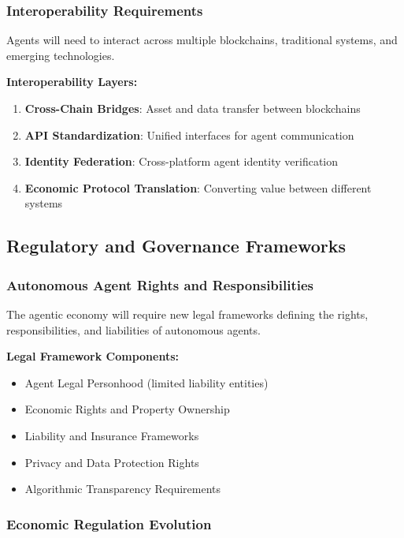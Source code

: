 \documentclass[12pt,a4paper]{article}
\begin{document}
\subsubsection{Interoperability Requirements}

Agents will need to interact across multiple blockchains, traditional systems, and emerging technologies.

\textbf{Interoperability Layers:}
\begin{enumerate}
\item \textbf{Cross-Chain Bridges}: Asset and data transfer between blockchains
\item \textbf{API Standardization}: Unified interfaces for agent communication
\item \textbf{Identity Federation}: Cross-platform agent identity verification
\item \textbf{Economic Protocol Translation}: Converting value between different systems
\end{enumerate}

\subsection{Regulatory and Governance Frameworks}

\subsubsection{Autonomous Agent Rights and Responsibilities}

The agentic economy will require new legal frameworks defining the rights, responsibilities, and liabilities of autonomous agents.

\textbf{Legal Framework Components:}
\begin{itemize}
\item Agent Legal Personhood (limited liability entities)
\item Economic Rights and Property Ownership
\item Liability and Insurance Frameworks
\item Privacy and Data Protection Rights
\item Algorithmic Transparency Requirements
\end{itemize}

\subsubsection{Economic Regulation Evolution}
\end{document}
